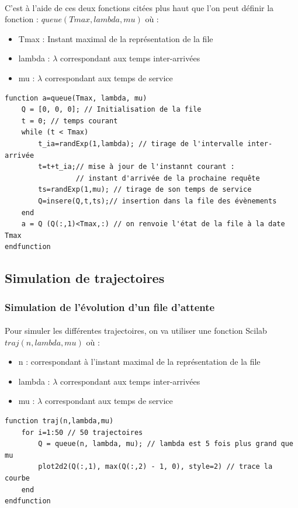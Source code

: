 \documentclass{article}
\begin{document}
\paragraph{}
C'est à l'aide de ces deux fonctions citées plus haut que l'on peut définir la fonction : $queue(Tmax, lambda, mu)$ où :
\begin{itemize}
\item Tmax : Instant maximal de la représentation de la file
\item lambda : $\lambda$ correspondant aux temps inter-arrivées
\item mu :  $\lambda$ correspondant aux temps de service
\end{itemize}
\begin{verbatim}
function a=queue(Tmax, lambda, mu)
    Q = [0, 0, 0]; // Initialisation de la file
    t = 0; // temps courant
    while (t < Tmax)
        t_ia=randExp(1,lambda); // tirage de l'intervalle inter-arrivée
        t=t+t_ia;// mise à jour de l'instannt courant : 
                 // instant d'arrivée de la prochaine requête
        ts=randExp(1,mu); // tirage de son temps de service
        Q=insere(Q,t,ts);// insertion dans la file des évènements
    end
    a = Q (Q(:,1)<Tmax,:) // on renvoie l'état de la file à la date Tmax
endfunction
\end{verbatim}

\subsection{Simulation de trajectoires}

\subsubsection{Simulation de l'évolution d'un file d'attente}
\paragraph{}
Pour simuler les différentes trajectoires, on va utiliser une fonction Scilab $traj(n,lambda,mu)$ où :
\begin{itemize}
\item n : correspondant à l'instant maximal de la représentation de la file
\item lambda : $\lambda$ correspondant aux temps inter-arrivées
\item mu :  $\lambda$ correspondant aux temps de service
\end{itemize}
\begin{verbatim}
function traj(n,lambda,mu)
    for i=1:50 // 50 trajectoires
        Q = queue(n, lambda, mu); // lambda est 5 fois plus grand que mu
        plot2d2(Q(:,1), max(Q(:,2) - 1, 0), style=2) // trace la courbe
    end
endfunction
\end{verbatim}
\end{document}
